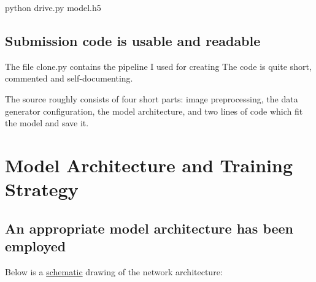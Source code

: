 \documentclass[a4paper,10pt]{article}
\begin{document}
\begin{center}
python drive.py model.h5
\end{center}

\subsection{Submission code is usable and readable}

The file clone.py contains the pipeline I used for creating 
The code is quite short, commented and self-documenting.

The source roughly consists of four short parts: image preprocessing, the data generator configuration, the model architecture,
and two lines of code which fit the model and save it.

\section{Model Architecture and Training Strategy}


\subsection{An appropriate model architecture has been employed}
\def\layersep{1.6cm}

Below is a \underline{schematic} drawing of the network architecture:
\end{document}
